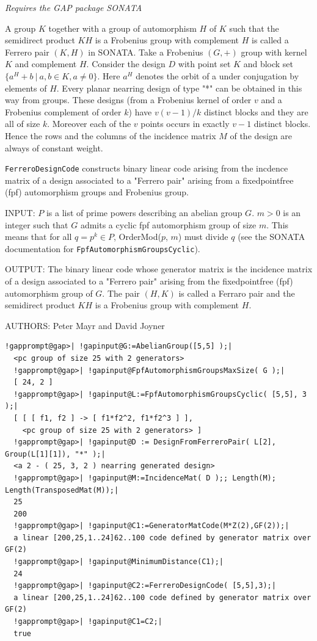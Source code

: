 \documentclass[a4paper,11pt]{report}
\begin{document}
{{{ \emph{Requires the GAP package SONATA} 

 A group $K$ together with a group of automorphism $H$ of $K$ such that the semidirect product $KH$ is a Frobenius group with complement $H$ is called a Ferrero pair $(K, H)$ in SONATA. Take a Frobenius $(G,+)$ group with kernel $K$ and complement $H$. Consider the design $D$ with point set $K$ and block set $\{ a^H + b\ |\ a, b \in K, a \not= 0 \}$. Here $a^H$ denotes the orbit of a under conjugation by elements of $H$. Every planar near\texttt{}ring design of type "*" can be obtained
in this way from groups. These designs (from a Frobenius kernel of order $v$ and a Frobenius complement of order $k$) have $v(v-1)/k$ distinct blocks and they are all of size $k$. Moreover each of the $v$ points occurs in exactly $v-1$ distinct blocks. Hence the rows and the columns of the incidence matrix $M$ of the design are always of constant weight. 

 \texttt{FerreroDesignCode} constructs binary linear code arising from the incdence matrix of a design
associated to a "Ferrero pair" arising from a
fixed\texttt{}point\texttt{}free (fpf) automorphism
groups and Frobenius group. 

 INPUT: $P$ is a list of prime powers describing an abelian group $G$. $m > 0$ is an integer such that $G$ admits a cyclic fpf automorphism group of size $m$. This means that for all $q = p^k \in P$, OrderMod($p$, $m$) must divide $q$ (see the SONATA documentation for \texttt{FpfAutomorphismGroupsCyclic}). 

 OUTPUT: The binary linear code whose generator matrix is the incidence matrix
of a design associated to a "Ferrero pair" arising from the
fixed\texttt{}point\texttt{}free (fpf) automorphism
group of $G$. The pair $(H,K)$ is called a Ferraro pair and the semidirect product $KH$ is a Frobenius group with complement $H$. 

 AUTHORS: Peter Mayr and David Joyner }

 
\begin{Verbatim}[commandchars=!@|,fontsize=\small,frame=single,label=Example]
  !gapprompt@gap>| !gapinput@G:=AbelianGroup([5,5] );|
  <pc group of size 25 with 2 generators>
  !gapprompt@gap>| !gapinput@FpfAutomorphismGroupsMaxSize( G );|
  [ 24, 2 ]
  !gapprompt@gap>| !gapinput@L:=FpfAutomorphismGroupsCyclic( [5,5], 3 );|
  [ [ [ f1, f2 ] -> [ f1*f2^2, f1*f2^3 ] ], 
    <pc group of size 25 with 2 generators> ]
  !gapprompt@gap>| !gapinput@D := DesignFromFerreroPair( L[2], Group(L[1][1]), "*" );|
  <a 2 - ( 25, 3, 2 ) nearring generated design>
  !gapprompt@gap>| !gapinput@M:=IncidenceMat( D );; Length(M); Length(TransposedMat(M));|
  25
  200
  !gapprompt@gap>| !gapinput@C1:=GeneratorMatCode(M*Z(2),GF(2));|
  a linear [200,25,1..24]62..100 code defined by generator matrix over GF(2)
  !gapprompt@gap>| !gapinput@MinimumDistance(C1);|
  24
  !gapprompt@gap>| !gapinput@C2:=FerreroDesignCode( [5,5],3);|
  a linear [200,25,1..24]62..100 code defined by generator matrix over GF(2)
  !gapprompt@gap>| !gapinput@C1=C2;|
  true
\end{Verbatim}
  

}}
\end{document}
